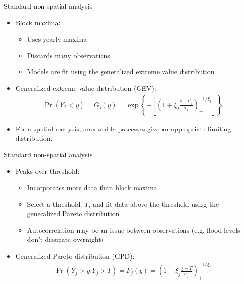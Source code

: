 \documentclass{beamer}
\begin{document}
\begin{frame}{Standard non-spatial analysis}
  \begin{itemize} \setlength{\itemsep}{0.5em}
    \item Block maxima:
    \begin{itemize}
      \item Uses yearly maxima
      \item Discards many observations
      \item Models are fit using the generalized extreme value distribution
    \end{itemize}
    \item Generalized extreme value distribution (GEV):
    \begin{align*}
      \Pr(Y_j < y) = G_j(y) = \exp \left\{ -\left[ \left(1 + \xi_j \frac{y - \mu_j}{\sigma_j}\right)_+^{-1/\xi_j} \right] \right\}
    \end{align*}
    \item For a spatial analysis, max-stable processes give an appropriate limiting distribution.
  \end{itemize}
\end{frame}

\begin{frame}{Standard non-spatial analysis}
  \begin{itemize}
    \item Peaks-over-threshold:
    \begin{itemize}
      \item Incorporates more data than block maxima
      \item Select a threshold, $T$, and fit data above the threshold using the generalized Pareto distribution
      \item Autocorrelation may be an issue between observations (e.g. flood levels don't dissipate overnight)
    \end{itemize}
    \item Generalized Pareto distribution (GPD):
    \begin{align*}
      \Pr(Y_j > y | Y_j > T) = F_j(y) = \left( 1 + \xi_j \frac{y - T}{\sigma_j} \right)_+^{-1/\xi_j}
    \end{align*}
  \end{itemize}
\end{frame}
\end{document}
